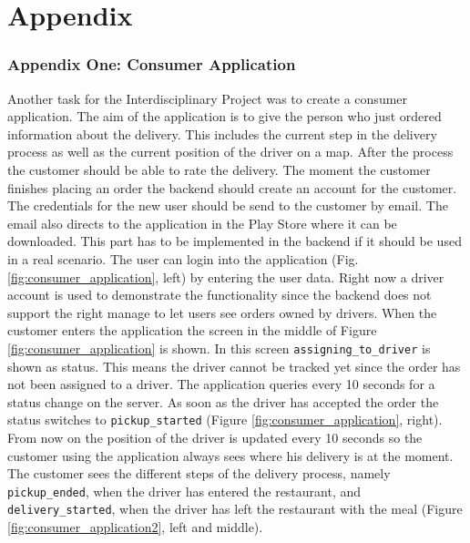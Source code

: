 \part*{Appendix}
\renewcommand{\thesection}{\arabic{section}}
\renewcommand{\theequation}{\arabic{equation}}
\section{Appendix One: Consumer Application}\label{section:Appendix One: Consumer Application}

Another task for the Interdisciplinary Project was to create a consumer application. The aim of the application is to give the person who just ordered information about the delivery. This includes the current step in the delivery process as well as the current position of the driver on a map. After the process the customer should be able to rate the delivery.\newline
The moment the customer finishes placing an order the backend should create an account for the customer. The credentials for the new user should be send to the customer by email. The email also directs to the application in the Play Store where it can be downloaded. This part has to be implemented in the backend if it should be used in a real scenario.\newline
The user can login into the application (Fig. \ref{fig:consumer_application}, left) by entering the user data. Right now a driver account is used to demonstrate the functionality since the backend does not support the right manage to let users see orders owned by drivers.\newline
When the customer enters the application the screen in the middle of Figure \ref{fig:consumer_application} is shown. In this screen \texttt{assigning\_to\_driver} is shown as status. This means the driver cannot be tracked yet since the order has not been assigned to a driver. The application queries every 10 seconds for a status change on the server. As soon as the driver has accepted the order the status switches to \texttt{pickup\_started} (Figure \ref{fig:consumer_application}, right). From now on the position of the driver is updated every 10 seconds so the customer using the application always sees where his delivery is at the moment. The customer sees the different steps of the delivery process, namely \texttt{pickup\_ended}, when the driver has entered the restaurant, and \texttt{delivery\_started}, when the driver has left the restaurant with the meal (Figure \ref{fig:consumer_application2}, left and middle).\newline
